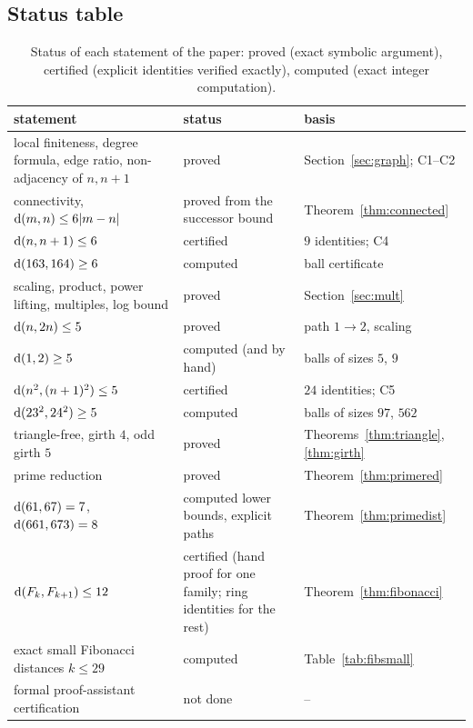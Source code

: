 \subsection{Status table}
\begin{table}[H]\centering\small
\begin{tabular}{@{}p{}p{}p{}@{}}\toprule
statement & status & basis\\\midrule
local finiteness, degree formula, edge ratio, non-adjacency of $n,n+1$ & proved & Section~\ref{sec:graph}; C1--C2\\
connectivity, $\operatorname{d}(m,n)\le6|m-n|$ & proved from the successor bound & Theorem~\ref{thm:connected}\\
$\operatorname{d}(n,n+1)\le6$ & certified & $9$ identities; C4\\
$\operatorname{d}(163,164)\ge6$ & computed & ball certificate\\
scaling, product, power lifting, multiples, log bound & proved & Section~\ref{sec:mult}\\
$\operatorname{d}(n,2n)\le5$ & proved & path $1\to2$, scaling\\
$\operatorname{d}(1,2)\ge5$ & computed (and by hand) & balls of sizes $5$, $9$\\
$\operatorname{d}(n^2,(n+1)^2)\le5$ & certified & $24$ identities; C5\\
$\operatorname{d}(23^2,24^2)\ge5$ & computed & balls of sizes $97$, $562$\\
triangle-free, girth $4$, odd girth $5$ & proved & Theorems~\ref{thm:triangle}, \ref{thm:girth}\\
prime reduction & proved & Theorem~\ref{thm:primered}\\
$\operatorname{d}(61,67)=7$, $\operatorname{d}(661,673)=8$ & computed lower bounds, explicit paths & Theorem~\ref{thm:primedist}\\
$\operatorname{d}(F_k,F_{k+1})\le12$ & certified (hand proof for one family; ring identities for the rest) & Theorem~\ref{thm:fibonacci}\\
exact small Fibonacci distances $k\le29$ & computed & Table~\ref{tab:fibsmall}\\
formal proof-assistant certification & not done & --\\\bottomrule
\end{tabular}
\caption{Status of each statement of the paper: proved (exact symbolic argument), certified (explicit identities verified exactly), computed (exact integer computation).}\label{tab:status}
\end{table}

